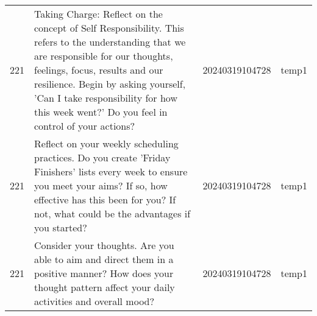 \begin{longtable}{rlll}
221 &                                                                                                                                                                                                                                                                                                                                                                                                                                                                                                                                                                                                                                                         Taking Charge: Reflect on the concept of Self Responsibility. This refers to the understanding that we are responsible for our thoughts, feelings, focus, results and our resilience. Begin by asking yourself, 'Can I take responsibility for how this week went?' Do you feel in control of your actions? & 20240319104728 &       temp1 \\
221 &                                                                                                                                                                                                                                                                                                                                                                                                                                                                                                                                                                                                                                                                                                                                       Reflect on your weekly scheduling practices. Do you create 'Friday Finishers' lists every week to ensure you meet your aims? If so, how effective has this been for you? If not, what could be the advantages if you started? & 20240319104728 &       temp1 \\
221 &                                                                                                                                                                                                                                                                                                                                                                                                                                                                                                                                                                                                                                                                                                                                                                                                      Consider your thoughts. Are you able to aim and direct them in a positive manner? How does your thought pattern affect your daily activities and overall mood? & 20240319104728 &       temp1 \\

\end{longtable}
